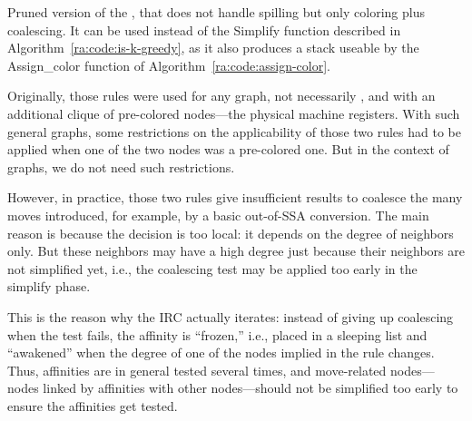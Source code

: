 {\begin{algorithm}[h]
\caption{Pruned version of the \irc, that does not handle spilling but only coloring plus coalescing.
  It can be used instead of the Simplify function described in Algorithm~\ref{ra:code:is-k-greedy}, as it also produces a stack useable by the Assign\_color function of Algorithm~\ref{ra:code:assign-color}.}
\label{ra:code:IRC}


\end{algorithm}

Originally, those rules were used for any graph, not necessarily \gr{\regs}, and with an additional clique of pre-colored nodes---the physical machine registers.
With such general graphs, some restrictions on the applicability of those two rules had to be applied when one of the two nodes was a pre-colored one.
But in the context of \gr{\regs} graphs, we do not need such restrictions.

However, in practice, those two rules give insufficient results to coalesce the many moves introduced, for example, by a basic out-of-{SSA} conversion.
The main reason is because the decision is too local: it depends on the degree of neighbors only.
But these neighbors may have a high degree just because their neighbors are not simplified yet, i.e., the coalescing test may be applied too early in the simplify phase.

This is the reason why the IRC actually iterates: 
instead of giving up coalescing when the test fails, the affinity is ``frozen,'' i.e., placed in a sleeping list and ``awakened'' when the degree of one of the nodes implied in the rule changes.
Thus, affinities are in general tested several times, and move-related nodes---nodes linked by affinities with other nodes---should not be simplified too early to ensure the affinities get tested.

}
